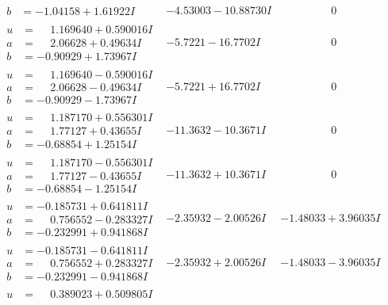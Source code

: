 \documentclass[1p]{elsarticle_modified}
\theoremstyle{definition}
\begin{document}
$$\begin{array}{c|c|c}
\begin{aligned}
b &= -1.04158 + 1.61922 I\end{aligned}
 & -4.53003 - 10.88730 I & \phantom{-0.000000 } 0 \\ \hline\begin{aligned}
u &= \phantom{-}1.169640 + 0.590016 I \\
a &= \phantom{-}2.06628 + 0.49634 I \\
b &= -0.90929 + 1.73967 I\end{aligned}
 & -5.7221 - 16.7702 I & \phantom{-0.000000 } 0 \\ \hline\begin{aligned}
u &= \phantom{-}1.169640 - 0.590016 I \\
a &= \phantom{-}2.06628 - 0.49634 I \\
b &= -0.90929 - 1.73967 I\end{aligned}
 & -5.7221 + 16.7702 I & \phantom{-0.000000 } 0 \\ \hline\begin{aligned}
u &= \phantom{-}1.187170 + 0.556301 I \\
a &= \phantom{-}1.77127 + 0.43655 I \\
b &= -0.68854 + 1.25154 I\end{aligned}
 & -11.3632 - 10.3671 I & \phantom{-0.000000 } 0 \\ \hline\begin{aligned}
u &= \phantom{-}1.187170 - 0.556301 I \\
a &= \phantom{-}1.77127 - 0.43655 I \\
b &= -0.68854 - 1.25154 I\end{aligned}
 & -11.3632 + 10.3671 I & \phantom{-0.000000 } 0 \\ \hline\begin{aligned}
u &= -0.185731 + 0.641811 I \\
a &= \phantom{-}0.756552 - 0.283327 I \\
b &= -0.232991 + 0.941868 I\end{aligned}
 & -2.35932 - 2.00526 I & -1.48033 + 3.96035 I \\ \hline\begin{aligned}
u &= -0.185731 - 0.641811 I \\
a &= \phantom{-}0.756552 + 0.283327 I \\
b &= -0.232991 - 0.941868 I\end{aligned}
 & -2.35932 + 2.00526 I & -1.48033 - 3.96035 I \\ \hline\begin{aligned}
u &= \phantom{-}0.389023 + 0.509805 I \\

\end{aligned}
\end{array}$$
\end{document}
